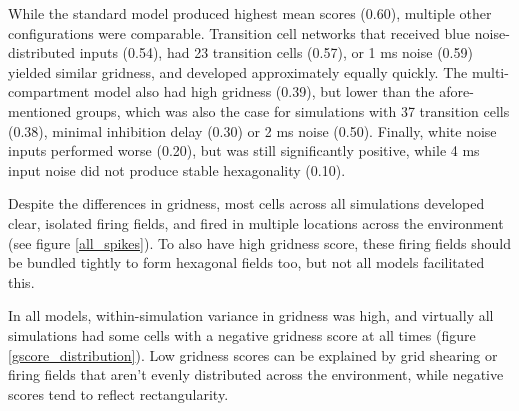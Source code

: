 \documentclass{article}
\begin{document}
    While the standard model produced highest mean scores (0.60), multiple other configurations were comparable. Transition cell networks that received blue noise-distributed inputs (0.54), had 23 transition cells (0.57), or 1 ms noise (0.59) yielded similar gridness, and developed approximately equally quickly. The multi-compartment model also had high gridness (0.39), but lower than the afore-mentioned groups, which was also the case for simulations with 37 transition cells (0.38), minimal inhibition delay (0.30) or 2 ms noise (0.50). Finally, white noise inputs performed worse (0.20), but was still significantly positive, while 4 ms input noise did not produce stable hexagonality (0.10).
    
    Despite the differences in gridness, most cells across all simulations developed clear, isolated firing fields, and fired in multiple locations across the environment (see figure \ref{all_spikes}). To also have high gridness score, these firing fields should be bundled tightly to form hexagonal fields too, but not all models facilitated this.

    In all models, within-simulation variance in gridness was high, and virtually all simulations had some cells with a negative gridness score at all times (figure \ref{gscore_distribution}). Low gridness scores can be explained by grid shearing or firing fields that aren't evenly distributed across the environment, while negative scores tend to reflect rectangularity.
\end{document}
